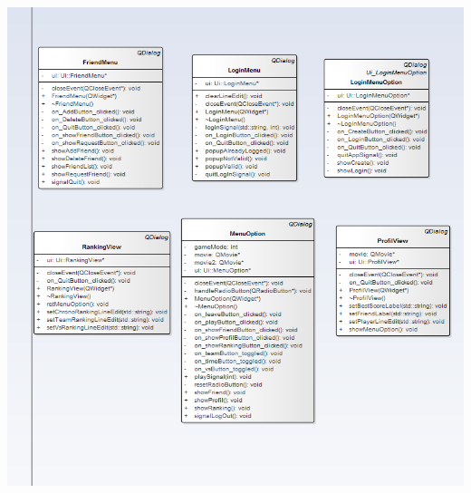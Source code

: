 \documentclass[12pt,a4paper]{article}
\begin{document}
 
  \includegraphics[height=20cm,width=20cm]{guiClass3.png}
  
\end{document}
